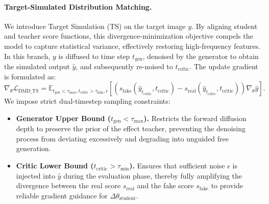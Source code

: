 \documentclass{llmxive}
\begin{document}
\paragraph{Target-Simulated Distribution Matching.}
We introduce Target Simulation (TS) on the target image $y$. By aligning student and teacher score functions, this divergence-minimization objective compels the model to capture statistical variance, effectively restoring high-frequency features.
In this branch, $y$ is diffused to time step $t_{\text{gen}}$, denoised by the generator to obtain the simulated output $\hat{y}$, and subsequently re-noised to $t_{\text{critic}}$.
The update gradient is formulated as:
\begin{equation}
\nabla_{\theta}\mathcal{L}_{\text{DMD\_TS}} = \mathbb{E}_{t_{\text{gen}} < \tau_{\text{max}}, t_{\text{critic}} > \tau_{\text{min}}, \epsilon} \left[ \left( s_{\text{fake}}(\hat{y}_{t_{\text{critic}}}, t_{\text{critic}}) - s_{\text{real}}(\hat{y}_{t_{\text{critic}}}, t_{\text{critic}}) \right) \nabla_{\theta}\hat{y} \right].
\end{equation}
We impose strict dual-timestep sampling constraints:
\begin{itemize}
    \item \textbf{Generator Upper Bound ($t_{\text{gen}} < \tau_{\text{max}}$).} Restricts the forward diffusion depth to preserve the prior of the effect teacher, preventing the denoising process from deviating excessively and degrading into unguided free generation.
    \item \textbf{Critic Lower Bound ($t_{\text{critic}} > \tau_{\text{min}}$).} Ensures that sufficient noise $\epsilon$ is injected into $\hat{y}$ during the evaluation phase, thereby fully amplifying the divergence between the real score $s_{\text{real}}$ and the fake score $s_{\text{fake}}$ to provide reliable gradient guidance for $\Delta\theta_{\text{student}}$.
\end{itemize}
\end{document}
